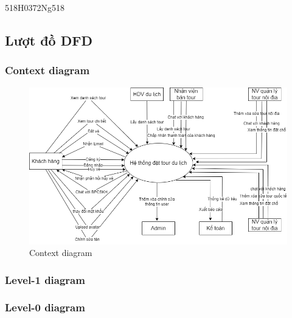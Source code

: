 518H0372Ng518\subsection{Lượt đồ DFD}

\subsubsection{Context diagram}

\vspace{3cm}

\begin{figure}[ht]
    \centering
    \includegraphics[width = 1\linewidth]{figures/DFDsContext.png}
    \caption{Context diagram}
    \label{fig:example_1}
\end{figure}

\vspace{10cm}

\subsubsection{Level-1 diagram}
\subsubsection{Level-0 diagram}

\vspace{3cm}

